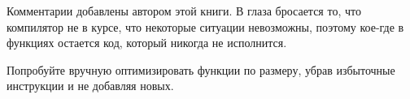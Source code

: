 




Комментарии добавлены автором этой книги.
В глаза бросается то, что компилятор не в курсе, что некоторые ситуации невозможны,
поэтому кое-где в функциях остается код, который никогда не исполнится.

\myparagraphold{\Exercise}

Попробуйте вручную оптимизировать функции по размеру, убрав избыточные инструкции и не добавляя новых.
